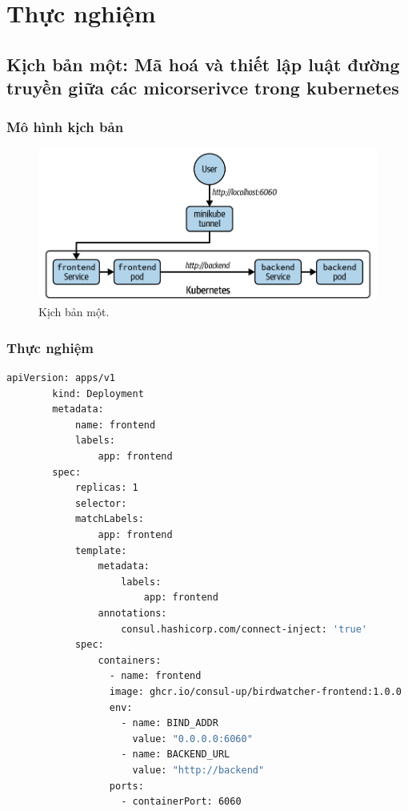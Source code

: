 \documentclass[12pt,a4paper]{report}
\begin{document}
	\section{Thực nghiệm}
	\subsection{Kịch bản một: Mã hoá và thiết lập luật đường truyền giữa các micorserivce trong kubernetes}
	\subsubsection{Mô hình kịch bản}
	 \begin{figure}[h]
		\centering
		\includegraphics[width=1\linewidth]{Pics/kb1}
		\caption{\label{fig:kb1} Kịch bản một.}
		\label{fig:kb1}
	\end{figure}
	
	\hspace{1.0cm}{Ở trong kịch bản này, mục tiêu của chúng ta là sẽ tiến hành mã hoá và thiết lập các luật cho microservice. Các cách mã hoá sẽ được giải thích ở phần bên dưới.}
	\subsubsection{Thực nghiệm}
	\hspace{1.0cm}{Đầu tiên, chúng ta có tạo một tệp tin cấu hình của ứng dụng và service dành cho frontend, nội dung của tệp tin đó như sau:}
	\begin{lstlisting}[language=Bash]
		apiVersion: apps/v1
		kind: Deployment
		metadata:
			name: frontend
			labels:
				app: frontend
		spec:
			replicas: 1
			selector:
			matchLabels:
				app: frontend
			template:
				metadata:
					labels:
						app: frontend
				annotations:
					consul.hashicorp.com/connect-inject: 'true'
			spec:
				containers:
				  - name: frontend
				  image: ghcr.io/consul-up/birdwatcher-frontend:1.0.0
				  env:
					- name: BIND_ADDR
					  value: "0.0.0.0:6060"
					- name: BACKEND_URL
					  value: "http://backend"
				  ports:
				    - containerPort: 6060
	\end{lstlisting}
\end{document}
